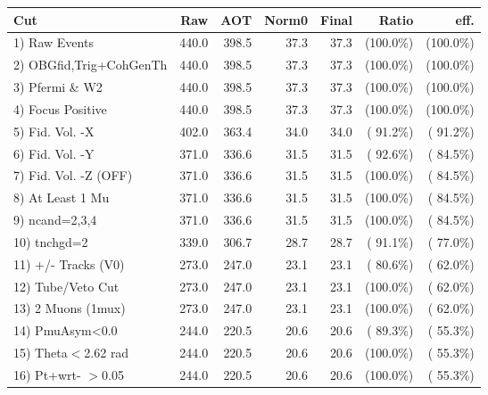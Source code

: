  \begin{table}[h!]\centering
 \begin{tabular}{||l||r|r|r|r|r|r||}
 \hline
 \hline
 Cut & Raw & AOT & Norm0 & Final & Ratio & eff.       \\
 \hline
  1) Raw Events           &        440.0 &        398.5 &         37.3 &         37.3 & (100.0\%) & (100.0\%) \\
  2) OBGfid,Trig+CohGenTh &        440.0 &        398.5 &         37.3 &         37.3 & (100.0\%) & (100.0\%) \\
  3) Pfermi \& W2         &        440.0 &        398.5 &         37.3 &         37.3 & (100.0\%) & (100.0\%) \\
  4) Focus Positive       &        440.0 &        398.5 &         37.3 &         37.3 & (100.0\%) & (100.0\%) \\
  5) Fid. Vol. -X         &        402.0 &        363.4 &         34.0 &         34.0 & ( 91.2\%) & ( 91.2\%) \\
  6) Fid. Vol. -Y         &        371.0 &        336.6 &         31.5 &         31.5 & ( 92.6\%) & ( 84.5\%) \\
  7) Fid. Vol. -Z (OFF)   &        371.0 &        336.6 &         31.5 &         31.5 & (100.0\%) & ( 84.5\%) \\
  8) At Least 1 Mu        &        371.0 &        336.6 &         31.5 &         31.5 & (100.0\%) & ( 84.5\%) \\
  9) ncand=2,3,4          &        371.0 &        336.6 &         31.5 &         31.5 & (100.0\%) & ( 84.5\%) \\
 10) tnchgd=2             &        339.0 &        306.7 &         28.7 &         28.7 & ( 91.1\%) & ( 77.0\%) \\
 11) +/- Tracks (V0)      &        273.0 &        247.0 &         23.1 &         23.1 & ( 80.6\%) & ( 62.0\%) \\
 12) Tube/Veto Cut        &        273.0 &        247.0 &         23.1 &         23.1 & (100.0\%) & ( 62.0\%) \\
 13) 2 Muons (1mux)       &        273.0 &        247.0 &         23.1 &         23.1 & (100.0\%) & ( 62.0\%) \\
 14) PmuAsym<0.0          &        244.0 &        220.5 &         20.6 &         20.6 & ( 89.3\%) & ( 55.3\%) \\
 15) Theta$<$2.62 rad     &        244.0 &        220.5 &         20.6 &         20.6 & (100.0\%) & ( 55.3\%) \\
 16) Pt+wrt- $>$0.05      &        244.0 &        220.5 &         20.6 &         20.6 & (100.0\%) & ( 55.3\%) \\

\end{tabular}
\end{table}
